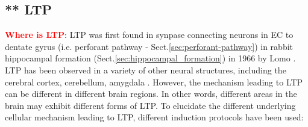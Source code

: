 \subsection{** LTP}
\label{sec:LTP}
\label{sec:LTP_depend-NMDAR}
\label{sec:BDNF-mediate-LTP}


\textcolor{red}{\bf Where is LTP}: LTP was first found in synpase connecting
neurons in EC to dentate gyrus (i.e. perforant pathway -
Sect.\ref{sec:perforant-pathway}) in rabbit hippocampal formation
(Sect.\ref{sec:hippocampal_formation}) in 1966 by Lomo \citep{lomo1966}.
LTP has been observed in a variety of other neural structures, including the
cerebral cortex, cerebellum, amygdala \citep{malenka2004}.
However, the mechanism leading to LTP can be different in different brain
regions. In other words, different areas in the brain may exhibit different
forms of LTP. To elucidate the different underlying cellular mechanism leading
to LTP, different induction protocols have been used:

